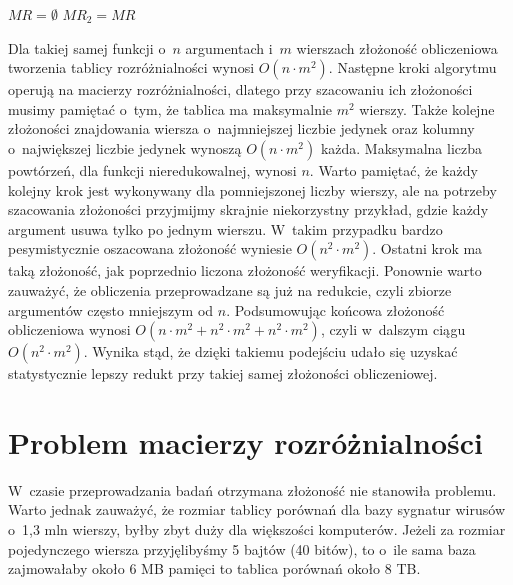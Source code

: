 \begin{algorithm}[H]
    $MR=\emptyset$\;
    $MR_2 = MR$\;
\end{algorithm}

Dla takiej samej funkcji o~$n$ argumentach i~$m$ wierszach złożoność obliczeniowa tworzenia tablicy rozróżnialności wynosi $O(n \cdot m^2)$.
Następne kroki algorytmu operują na macierzy rozróżnialności,
dlatego przy szacowaniu ich złożoności musimy pamiętać o~tym,
że tablica ma maksymalnie $m^2$ wierszy.
Także kolejne złożoności znajdowania wiersza o~najmniejszej liczbie jedynek oraz kolumny o~największej liczbie jedynek wynoszą $O(n \cdot m^2)$ każda.
Maksymalna liczba powtórzeń,
dla funkcji nieredukowalnej,
wynosi $n$.
Warto pamiętać,
że każdy kolejny krok jest wykonywany dla pomniejszonej liczby wierszy,
ale na potrzeby szacowania złożoności przyjmijmy skrajnie niekorzystny przykład,
gdzie każdy argument usuwa tylko po jednym wierszu.
W~takim przypadku bardzo pesymistycznie oszacowana złożoność wyniesie $O(n^2 \cdot m^2)$.
Ostatni krok ma taką złożoność,
jak poprzednio liczona złożoność weryfikacji.
Ponownie warto zauważyć,
że obliczenia przeprowadzane są już na redukcie,
czyli zbiorze argumentów często mniejszym od $n$.
Podsumowując końcowa złożoność obliczeniowa wynosi $O(n \cdot m^2 + n^2 \cdot m^2 + n^2 \cdot m^2)$,
czyli w~dalszym ciągu $O(n^2 \cdot m^2)$.
Wynika stąd,
że dzięki takiemu podejściu udało się uzyskać statystycznie lepszy redukt przy takiej samej złożoności obliczeniowej.


\section{Problem macierzy rozróżnialności}

W~czasie przeprowadzania badań otrzymana złożoność nie stanowiła problemu.
Warto jednak zauważyć,
że rozmiar tablicy porównań dla bazy sygnatur wirusów o~1,3 mln wierszy,
byłby zbyt duży dla większości komputerów.
Jeżeli za rozmiar pojedynczego wiersza przyjęlibyśmy 5 bajtów (40 bitów), to o~ile sama baza zajmowałaby około 6 MB pamięci to tablica porównań około 8 TB.

